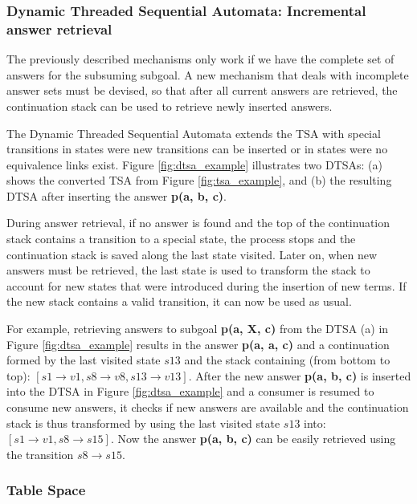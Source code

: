   \subsubsection{Dynamic Threaded Sequential Automata: Incremental answer retrieval}
  
  The previously described mechanisms only work if we have the complete set of answers for the subsuming subgoal.
  A new mechanism that deals with incomplete answer sets must be devised, so that after all current answers
  are retrieved, the continuation stack can be used to retrieve newly inserted answers.
  
  The Dynamic Threaded Sequential Automata extends the TSA with special transitions in states
  were new transitions can be inserted or in states were no equivalence links exist.
  Figure \ref{fig:dtsa_example} illustrates two DTSAs: (a) shows the converted TSA from Figure \ref{fig:tsa_example}, and
  (b) the resulting DTSA after inserting the answer \textbf{p(a, b, c)}.
  
  During answer retrieval, if no answer is found and the top of the continuation stack contains
  a transition to a special state, the process stops and the continuation stack is saved along the last state
  visited.
  Later on, when new answers must be retrieved, the last state is used to transform the stack to account for new states that
  were introduced during the insertion of new terms. If the new stack contains a valid transition, it
  can now be used as usual.
  
  For example, retrieving answers to subgoal \textbf{p(a, X, c)} from the DTSA (a) in Figure
  \ref{fig:dtsa_example} results in the answer \textbf{p(a, a, c)} and a continuation formed by the last
  visited state $s13$ and the stack containing (from bottom to top): $[s1 \rightarrow v1, s8 \rightarrow v8, s13 \rightarrow v13]$.
  After the new answer \textbf{p(a, b, c)} is inserted into the DTSA in Figure \ref{fig:dtsa_example} and
  a consumer is resumed to consume new answers, it checks if new answers are available and the continuation stack
  is thus transformed by using the last visited state $s13$ into: $[s1 \rightarrow v1, s8 \rightarrow s15]$. Now
  the answer \textbf{p(a, b, c)} can be easily retrieved using the transition $s8 \rightarrow s15$.
  
  \subsubsection{Table Space}
  
